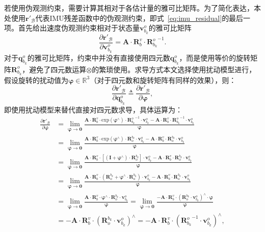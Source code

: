 若使用伪观测约束，需要计算其相对于各估计量的雅可比矩阵。为了简化表达，本处使用$\symbf{r}'_{\mathcal{B}}$代表IMU残差函数中的伪观测约束，即式~\eqref{eq:imu_residual}的最后一项。首先给出速度伪观测约束相对于状态量$\symbf{v}_{b_{k}}^o$的雅可比矩阵
\begin{equation}
  \frac{\partial \symbf{r}'_{\mathcal{B}}}{\partial \symbf{v}_{b_{k}}^o} = \symbf{A} \cdot \symbf{R}_b^v \cdot {\symbf{R}_{b_k}^o}^{-1}.
\label{eq:JrJv}
\end{equation}
对于$\symbf{q}_{b_{k}}^o$的雅可比矩阵，约束中并没有直接使用四元数$\symbf{q}_{b_{k}}^o$，而是使用等价的旋转矩阵$\symbf{R}_{b_{k}}^o$，避免了四元数运算$\otimes$的繁琐使用。求导方式本文选择使用扰动模型\cite{zhang2021pose}进行，假设旋转的扰动值为$\symbf{\varphi } \in \mathbb{R}^3$（对于四元数和旋转矩阵有同样的效果），则：
\begin{equation}
  \frac{\partial \symbf{r}'_{\mathcal{B}}}{\partial \symbf{q}_{b_{k}}^o} \triangleq  \frac{\partial \symbf{r}'_{\mathcal{B}}}{\partial \symbf{\varphi }},
\end{equation}
即使用扰动模型来替代直接对四元数求导，具体运算为：
\begin{align}
  \frac{\partial \symbf{r}'_{\mathcal{B}}}{\partial \symbf{\varphi }} 
  &= \lim\limits_{\symbf{\varphi } \to \symbf{0}} \frac{\symbf{A} \cdot \symbf{R}_b^v \cdot {\text{exp}(\symbf{\varphi }^{\land}) \cdot {\symbf{R}_{b_k}^o}^{-1}} \cdot \symbf{v}_{b_k}^o - \symbf{A} \cdot \symbf{R}_b^v \cdot {{\symbf{R}_{b_k}^o}^{-1}} \cdot \symbf{v}_{b_k}^o}{\symbf{\varphi }} \\
  &= \lim\limits_{\symbf{\varphi } \to \symbf{0}} \frac{\symbf{A} \cdot \symbf{R}_b^v \cdot {\text{exp}(\symbf{\varphi }^{\land}) \cdot \symbf{R}^{b_k}_o} \cdot \symbf{v}_{b_k}^o - \symbf{A} \cdot \symbf{R}_b^v \cdot {\symbf{R}^{b_k}_o} \cdot \symbf{v}_{b_k}^o}{\symbf{\varphi }} \\
  &= \lim\limits_{\symbf{\varphi } \to \symbf{0}} \frac{\symbf{A} \cdot \symbf{R}_b^v \cdot {[(\symbf{I} + \symbf{\varphi }^{\land}) \cdot \symbf{R}^{b_k}_o]} \cdot \symbf{v}_{b_k}^o - \symbf{A} \cdot \symbf{R}_b^v \cdot {\symbf{R}^{b_k}_o} \cdot \symbf{v}_{b_k}^o}{\symbf{\varphi }} \\
  &= \lim\limits_{\symbf{\varphi } \to \symbf{0}} \frac{\symbf{A} \cdot \symbf{R}_b^v \cdot {({\symbf{R}^{b_k}_o} + \symbf{\varphi }^{\land} \cdot \symbf{R}^{b_k}_o)} \cdot \symbf{v}_{b_k}^o - \symbf{A} \cdot \symbf{R}_b^v \cdot {\symbf{R}^{b_k}_o} \cdot \symbf{v}_{b_k}^o}{\symbf{\varphi }} \\
  &= \lim\limits_{\symbf{\varphi } \to \symbf{0}} \frac{\symbf{A} \cdot \symbf{R}_b^v \cdot {\symbf{\varphi }^{\land} \cdot \symbf{R}^{b_k}_o} \cdot \symbf{v}_{b_k}^o}{\symbf{\varphi }}
  = \lim\limits_{\symbf{\varphi } \to \symbf{0}} \frac{-\symbf{A} \cdot \symbf{R}_b^v \cdot ({\symbf{R}^{b_k}_o} \cdot \symbf{v}_{b_k}^{o})^{\land} \cdot \symbf{\varphi}}{\symbf{\varphi }} \\
  &= -\symbf{A} \cdot \symbf{R}_b^v \cdot ({\symbf{R}^{b_k}_o} \cdot \symbf{v}_{b_k}^{o})^{\land}
  = -\symbf{A} \cdot \symbf{R}_b^v \cdot ({\symbf{R}_{b_k}^o}^{-1} \cdot \symbf{v}_{b_k}^{o})^{\land}, \label{eq:JrJqb}
\end{align}
